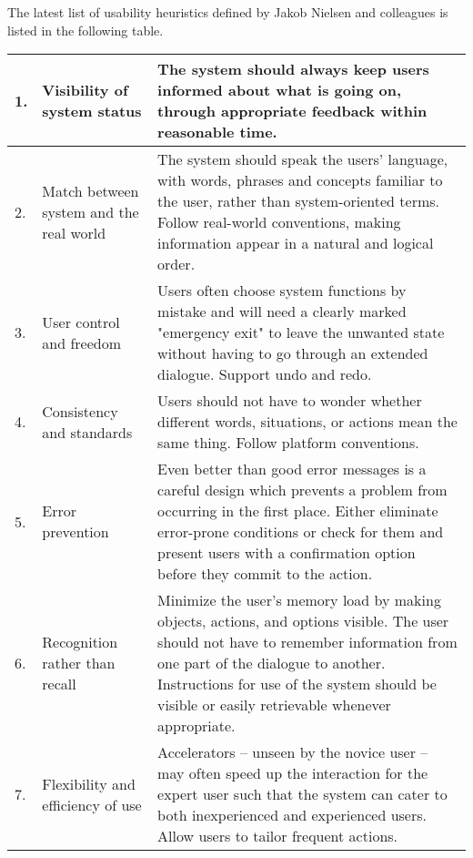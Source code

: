 The latest list of usability heuristics defined by Jakob Nielsen and colleagues \citep{NielsenMack} is listed in the following table. 

\begin{longtable}{|p{0.4cm} | p{5cm}|p{8cm}|}

 \hline
1. & Visibility of system status & The system should always keep users informed about what is going on, through appropriate feedback within reasonable time. \\ \hline

2. &Match between system and the real world & The system should speak the users' language, with words, phrases and concepts familiar to the user, rather than system-oriented terms. Follow real-world conventions, making information appear in a natural and logical order. \\ \hline

3. &User control and freedom& Users often choose system functions by mistake and will need a clearly marked "emergency exit" to leave the unwanted state without having to go through an extended dialogue. Support undo and redo.\\ \hline

4.& Consistency and standards & Users should not have to wonder whether different words, situations, or actions mean the same thing. Follow platform conventions. \\ \hline

5.& Error prevention & Even better than good error messages is a careful design which prevents a problem from occurring in the first place. Either eliminate error-prone conditions or check for them and present users with a confirmation option before they commit to the action.\\ \hline

6.& Recognition rather than recall & Minimize the user's memory load by making objects, actions, and options visible. The user should not have to remember information from one part of the dialogue to another. Instructions for use of the system should be visible or easily retrievable whenever appropriate.\\ \hline


7.& Flexibility and efficiency of use & Accelerators -- unseen by the novice user -- may often speed up the interaction for the expert user such that the system can cater to both inexperienced and experienced users. Allow users to tailor frequent actions.\\ \hline


\end{longtable}
